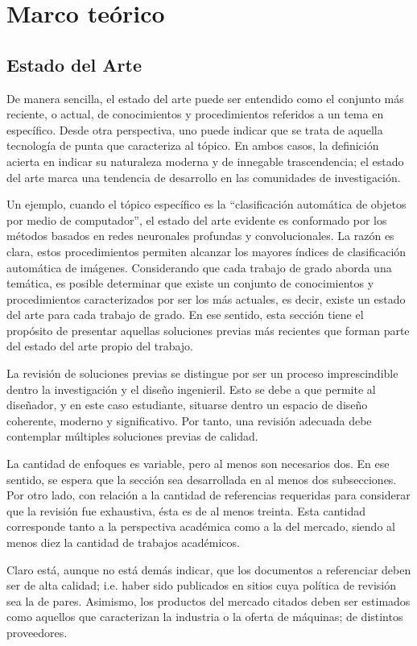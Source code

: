 \chapter{Marco teórico}
\label{sec:teoria}
\section{Estado del Arte }
De manera sencilla, el estado del arte puede ser entendido como el conjunto más reciente, o actual, de conocimientos y procedimientos referidos a un tema en específico. Desde otra perspectiva, uno puede indicar que se trata de aquella tecnología de punta que caracteriza al tópico. En ambos casos, la definición acierta en indicar su naturaleza moderna y de innegable trascendencia; el estado del arte marca una tendencia de desarrollo en las comunidades de investigación. 

Un ejemplo, cuando el tópico específico es la “clasificación automática de objetos por medio de computador”, el estado del arte evidente es conformado por los métodos basados en redes neuronales profundas y convolucionales. La razón es clara, estos procedimientos permiten alcanzar los mayores índices de clasificación automática de imágenes. 
Considerando que cada trabajo de grado aborda una temática, es posible determinar que existe un conjunto de conocimientos y procedimientos caracterizados por ser los más actuales, es decir, existe un estado del arte para cada trabajo de grado. En ese sentido, esta sección tiene el propósito de presentar aquellas soluciones previas más recientes que forman parte del estado del arte propio del trabajo. 

La revisión de soluciones previas se distingue por ser un proceso imprescindible dentro la investigación y el diseño ingenieril. Esto se debe a que permite al diseñador, y en este caso estudiante, situarse dentro un espacio de diseño coherente, moderno y significativo. Por tanto, una revisión adecuada debe contemplar múltiples soluciones previas de calidad. 

La cantidad de enfoques es variable, pero al menos son necesarios dos. En ese sentido, se espera que la sección sea desarrollada en al menos dos subsecciones. Por otro lado, con relación a la cantidad de referencias requeridas para considerar que la revisión fue exhaustiva, ésta es de al menos treinta. Esta cantidad corresponde tanto a la perspectiva académica como a la del mercado, siendo al menos diez la cantidad de trabajos académicos.

Claro está, aunque no está demás indicar, que los documentos a referenciar deben ser de alta calidad; i.e. haber sido publicados en sitios cuya política de revisión sea la de pares. Asimismo, los productos del mercado citados deben ser estimados como aquellos que caracterizan la industria o la oferta de máquinas; de distintos proveedores. 
 
